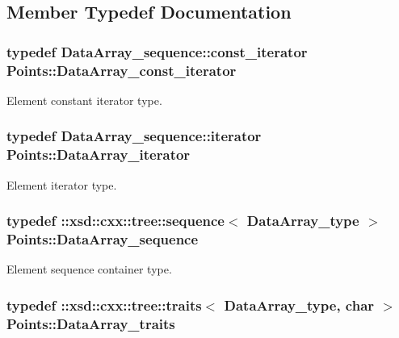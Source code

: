 \subsection{Member Typedef Documentation}
\hypertarget{classPoints_a795a395909c3360569fe0e854ba6059e}{
\subsubsection[{Data\+Array\+\_\+const\+\_\+iterator}]{\setlength{\rightskip}{0pt plus 5cm}typedef Data\+Array\+\_\+sequence\+::const\+\_\+iterator {\bf Points\+::\+Data\+Array\+\_\+const\+\_\+iterator}}}\label{classPoints_a795a395909c3360569fe0e854ba6059e}


Element constant iterator type. 

\hypertarget{classPoints_ac4cd7a177b464c1e08d493600a7e6e16}{
\subsubsection[{Data\+Array\+\_\+iterator}]{\setlength{\rightskip}{0pt plus 5cm}typedef Data\+Array\+\_\+sequence\+::iterator {\bf Points\+::\+Data\+Array\+\_\+iterator}}}\label{classPoints_ac4cd7a177b464c1e08d493600a7e6e16}


Element iterator type. 

\hypertarget{classPoints_ac8b51dcf0e7659ca61ff9b9d24051016}{
\subsubsection[{Data\+Array\+\_\+sequence}]{\setlength{\rightskip}{0pt plus 5cm}typedef \+::xsd\+::cxx\+::tree\+::sequence$<$ {\bf Data\+Array\+\_\+type} $>$ {\bf Points\+::\+Data\+Array\+\_\+sequence}}}\label{classPoints_ac8b51dcf0e7659ca61ff9b9d24051016}


Element sequence container type. 

\hypertarget{classPoints_a815b88c9204c7251f4a08c6769645ef1}{
\subsubsection[{Data\+Array\+\_\+traits}]{\setlength{\rightskip}{0pt plus 5cm}typedef \+::xsd\+::cxx\+::tree\+::traits$<$ {\bf Data\+Array\+\_\+type}, char $>$ {\bf Points\+::\+Data\+Array\+\_\+traits}}}\label{classPoints_a815b88c9204c7251f4a08c6769645ef1}



